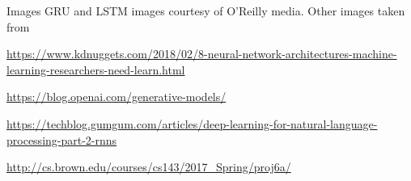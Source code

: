 \documentclass[10pt, table, dvipsnames,xcdraw, handout]{beamer}
\begin{document}
\begin{frame}[fragile]{Images}
GRU and LSTM images courtesy of O'Reilly media. Other images taken from

\url{https://www.kdnuggets.com/2018/02/8-neural-network-architectures-machine-learning-researchers-need-learn.html}

\url{https://blog.openai.com/generative-models/}

\url{https://techblog.gumgum.com/articles/deep-learning-for-natural-language-processing-part-2-rnns}

\url{http://cs.brown.edu/courses/cs143/2017_Spring/proj6a/}

\end{frame}
\end{document}
